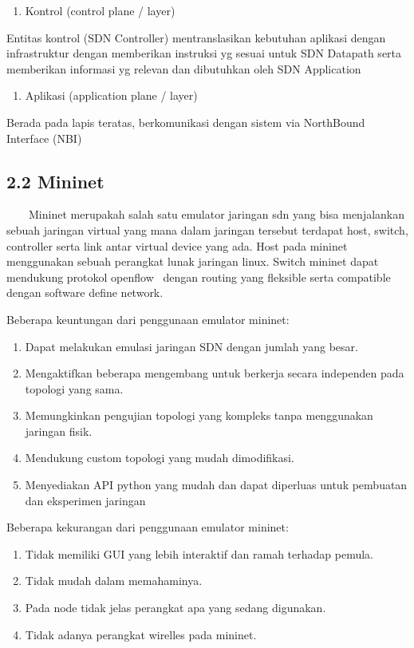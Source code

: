 \liststyleLiii
\setcounter{saveenum}{\value{enumi}}
\begin{enumerate}
\setcounter{enumi}{\value{saveenum}}
\item Kontrol (control plane / layer)
\end{enumerate}
Entitas kontrol (SDN Controller) mentranslasikan kebutuhan aplikasi dengan infrastruktur dengan memberikan instruksi yg
sesuai untuk SDN Datapath serta memberikan informasi yg relevan dan dibutuhkan oleh SDN Application

\liststyleLiii
\setcounter{saveenum}{\value{enumi}}
\begin{enumerate}
\setcounter{enumi}{\value{saveenum}}
\item Aplikasi (application plane / layer)
\end{enumerate}
Berada pada lapis teratas, berkomunikasi dengan sistem via NorthBound Interface (NBI)


\subsection{2.2 Mininet}
\ \ \ \ Mininet merupakah salah satu emulator jaringan sdn yang bisa menjalankan sebuah jaringan virtual yang mana dalam
jaringan tersebut terdapat host, switch, controller serta link antar virtual device yang ada. Host pada mininet
menggunakan sebuah perangkat lunak jaringan linux. Switch mininet dapat mendukung protokol openflow \ dengan routing
yang fleksible serta compatible dengan software define network. 

Beberapa keuntungan dari penggunaan emulator mininet:
\liststyleLiv
\begin{enumerate}
\item Dapat melakukan emulasi jaringan SDN dengan jumlah yang besar.
\item Mengaktifkan beberapa mengembang untuk berkerja secara independen pada topologi yang sama.
\item Memungkinkan pengujian topologi yang kompleks tanpa menggunakan jaringan fisik.
\item Mendukung custom topologi yang mudah dimodifikasi.
\item Menyediakan API python yang mudah dan dapat diperluas untuk pembuatan dan eksperimen jaringan
\end{enumerate}

Beberapa kekurangan dari penggunaan emulator mininet:
\liststyleLv
\begin{enumerate}
\item Tidak memiliki GUI yang lebih interaktif dan ramah terhadap pemula.
\item Tidak mudah dalam memahaminya.
\item Pada node tidak jelas perangkat apa yang sedang digunakan.
\item Tidak adanya perangkat wirelles pada mininet.
\end{enumerate}


